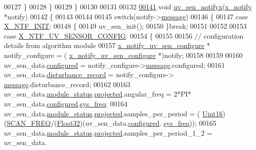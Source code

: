 \begin{DoxyCode}
00127         \}
00128     \}
00129 \}
00130 
00131 
00132 
\hypertarget{a00073_source_l00141}{}\hyperlink{a00073_ae2617634df4d3055161f7fb1f148f6da}{00141} \textcolor{keywordtype}{void} \hyperlink{a00073_ae2617634df4d3055161f7fb1f148f6da}{uv\_sen\_notifyx}(\hyperlink{a00036_df/d4c/a00851}{x\_notify} *notify)
00142 \{
00143 
00144 
00145     \textcolor{keywordflow}{switch}(notify->\hyperlink{a00036_adf9665938515a20c283eea2c978cf80d}{message})
00146     \{
00147         \textcolor{keywordflow}{case} \hyperlink{a00036_a620b808f2d7b8d2a03c4d026a4c5423c}{X\_NTF\_INIT}:
00148         \{
00149             uv\_sen\_init();
00150         \}\textcolor{keywordflow}{break};
00151 
00152 
00153         \textcolor{keywordflow}{case} \hyperlink{a00020_a08b676499fdf9649e575ed49e9197e13}{X\_NTF\_UV\_SENSOR\_CONFIG}:
00154         \{
00155 
00156             \textcolor{comment}{// configuration details from algorithm module}
00157             \hyperlink{a00020_dd/db2/a00866}{x\_notify\_uv\_sen\_configure} * notify\_configure = (
      \hyperlink{a00020_dd/db2/a00866}{x\_notify\_uv\_sen\_configure} *)notify;
00158 
00159 
00160             uv\_sen\_data.\hyperlink{a00035_a94b2d1f6ea4ab334c74d24984dd27843}{configured} = notify\_configure->\hyperlink{a00020_a1497b20cf78cad9e85b8ed48a9aa7bd2}{message}.configured;
00161             uv\_sen\_data.\hyperlink{a00035_ac9b38e2c1d3f1013a88d33506c754152}{disturbance\_record} = notify\_configure->
      \hyperlink{a00020_a1497b20cf78cad9e85b8ed48a9aa7bd2}{message}.disturbance\_record;
00162 
00163            uv\_sen\_data.\hyperlink{a00035_a5a53c391562b059eb744ac679f3765ca}{module\_status}.\hyperlink{a00017_a6b2516d74583418cec324c50041421c9}{projected}.angular\_freq             = 2*PI*
      uv\_sen\_data.\hyperlink{a00035_a94b2d1f6ea4ab334c74d24984dd27843}{configured}.\hyperlink{a00021_aa57be45aa1320405a885474010159c9e}{sys\_freq};
00164            uv\_sen\_data.\hyperlink{a00035_a5a53c391562b059eb744ac679f3765ca}{module\_status}.\hyperlink{a00017_a6b2516d74583418cec324c50041421c9}{projected}.samples\_per\_period       = (
      \hyperlink{a00072_a59a9f6be4562c327cbfb4f7e8e18f08b}{Uint16})(\hyperlink{a00021_a8127170b687c1f67a968886c128e76e4}{SCAN\_FREQ}/(\hyperlink{a00072_a87d38f886e617ced2698fc55afa07637}{Float32})(uv\_sen\_data.\hyperlink{a00035_a94b2d1f6ea4ab334c74d24984dd27843}{configured}.
      \hyperlink{a00021_aa57be45aa1320405a885474010159c9e}{sys\_freq}));
00165            uv\_sen\_data.\hyperlink{a00035_a5a53c391562b059eb744ac679f3765ca}{module\_status}.\hyperlink{a00017_a6b2516d74583418cec324c50041421c9}{projected}.samples\_per\_period\_1\_2  = uv\_sen\_data.

\end{DoxyCode}
